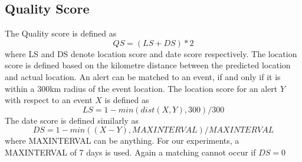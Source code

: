 \subsection{Quality Score}
The Quality score is defined as $$QS = (LS + DS)*2$$ where LS and DS denote location score and date score respectively. The location score is defined based on the kilometre distance between the predicted location and actual location. An alert can be matched to an event, if and only if it is within a 300km radius of the event location. The location score for an alert $Y$ with respect to an event $X$ is defined as $$LS=1 - min(dist(X,Y), 300) / 300 $$
The date score is defined similarly as $$DS = 1 - min( (X-Y), MAXINTERVAL)/MAXINTERVAL$$ where MAXINTERVAL  can be anything. For our experiments, a MAXINTERVAL of 7 days is used. Again a matching cannot occur if $DS=0$
